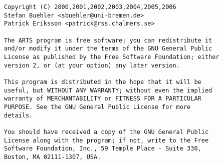 \newpage                          
\thispagestyle{empty}
\vspace*{\fill}
\noindent
\begin{verbatim}
Copyright (C) 2000,2001,2002,2003,2004,2005,2006
Stefan Buehler <sbuehler@uni-bremen.de>
Patrick Eriksson <patrick@rss.chalmers.se>

The ARTS program is free software; you can redistribute it
and/or modify it under the terms of the GNU General Public
License as published by the Free Software Foundation; either
version 2, or (at your option) any later version.

This program is distributed in the hope that it will be
useful, but WITHOUT ANY WARRANTY; without even the implied
warranty of MERCHANTABILITY or FITNESS FOR A PARTICULAR
PURPOSE. See the GNU General Public License for more
details. 

You should have received a copy of the GNU General Public
License along with the program; if not, write to the Free
Software Foundation, Inc., 59 Temple Place - Suite 330,
Boston, MA 02111-1307, USA. 
\end{verbatim}



